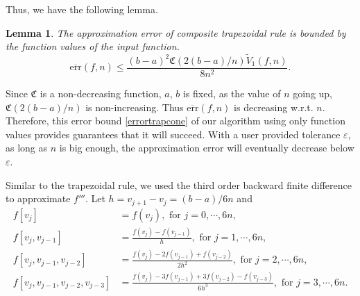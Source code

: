 \documentclass{iitthesis}
\DeclareMathOperator{\Var}{Var}
\newtheorem{lem}{Lemma}
\theoremstyle{definition}
\theoremstyle{remark}
\begin{document}
Thus, we have the following lemma.
\begin{lem}\label{lemmaerrorboundtrap}
    The approximation error of composite trapezoidal rule is bounded by the function values of the input function.
    \begin{equation}\label{errortrapcone}
      \overline{\text{err}}(f,n)\leq \frac{(b-a)^2\mathfrak{C}(2(b-a)/n)\widetilde{V}_1(f,n)}{8n^2}.
    \end{equation}
\end{lem}

Since $\mathfrak{C}$ is a non-decreasing function, $a$, $b$ is fixed, as the value of $n$ going up, $\mathfrak{C}(2(b-a)/n)$ is non-increasing. Thus $\overline{\text{err}}(f,n)$ is decreasing w.r.t. $n$. Therefore, this error bound \eqref{errortrapcone} of our algorithm using only function values provides guarantees that it will succeed. With a user provided tolerance $\varepsilon$, as long as $n$ is big enough, the approximation error will eventually decrease below $\varepsilon$.


Similar to the trapezoidal rule, we used the third order backward finite difference to approximate $f'''$. Let $h=v_{j+1}-v_{j}=(b-a)/6n$ and
\begin{align*}
  f[v_{j}]&=f(v_{j}), \text{ for } j=0,\cdots, 6n,\\
  f[v_{j},v_{j-1}]&=\frac{f(v_{j})-f(v_{j-1})}{h},\text{ for } j=1, \cdots, 6n,\\
  f[v_{j},v_{j-1},v_{j-2}]&=\frac{f(v_{j})-2f(v_{j-1})+f(v_{j-2})}{2h^2},\text{ for } j=2, \cdots, 6n,\\
  f[v_{j},v_{j-1},v_{j-2},v_{j-3}]&=\frac{f(v_{j})-3f(v_{j-1})+3f(v_{j-2})-f(v_{j-3})}{6h^3}, \text{ for } j=3, \cdots, 6n.
\end{align*}

\end{document}
